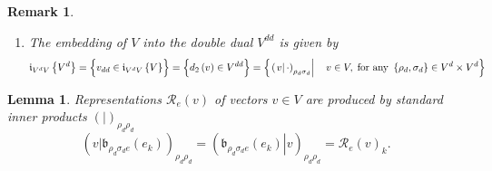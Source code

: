 \documentclass[aps,preprint]{revtex4}
\newtheorem{lemma}[theorem]{Lemma}
\newtheorem{remark}[theorem]{Remark}
\begin{document}
\begin{remark}
\begin{enumerate}
\begin{enumerate}
\item directly without reference to inner products 
\begin{equation}
v_{dd}\left( w_{d}\right) =\left[ \overset{}{d_{2}\left( v\right) }\right]
\left( w_{d}\right) =w_{d}\left( v\right) \quad \forall w_{d}\in
V^{d},\;v\in V.
\end{equation}
\end{enumerate}

\item The embedding of $V$ into the double dual $V^{dd}$ is given by 
\begin{equation}
\mathfrak{i}_{V^{d}V}\left\{ V^{d}\right\} =\left\{ \overset{}{v_{dd}\in 
\mathfrak{i}_{V^{d}V}\left\{ V\right\} }\right\} =\left\{ \overset{}{%
d_{2}\left( v\right) \in V^{dd}}\right\} =\left\{ \left. \left( \left. 
\overset{}{v}\right\vert \cdot \right) _{\rho _{d}\sigma _{d}}\right\vert
\quad v\in V,\;\text{for any }\left\{ \rho _{d},\sigma _{d}\right\} \in
V^{d}\times V^{d}\right\}
\end{equation}
\end{enumerate}
\end{remark}

\begin{lemma}
Representations $\mathcal{R}_{e}\left( v\right) $ of vectors $v\in V$ are
produced by standard inner products $\left( \left. {}\right\vert \right)
_{\rho _{d}\rho _{d}}$ 
%
\begin{equation}
\left( \left. v\right\vert \mathfrak{b}_{\rho _{d}\sigma _{d}e}\left(
e_{k}\right) \right) _{\rho _{d}\rho _{d}}=\left( \left. \mathfrak{b}_{\rho
_{d}\sigma _{d}e}\left( e_{k}\right) \right\vert v\right) _{\rho _{d}\rho
_{d}}=\mathcal{R}_{e}\left( v\right) _{k}.
\end{equation}
\end{lemma}
\end{document}
